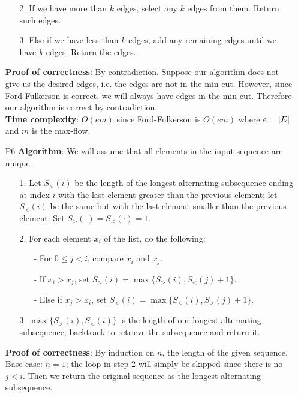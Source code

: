 \documentclass{article}
\begin{document}
\begin{itemize}
\begin{itemize}
              \item [2.] If we have more than $k$ edges, select any $k$ edges from them. Return such edges.
              \item [3.] Else if we have less than $k$ edges, add any remaining edges until we have $k$ edges. Return the edges.
          \end{itemize}
          \textbf{Proof of correctness}: By contradiction. Suppose our algorithm does not give us the desired edges, i.e. the edges are not in the min-cut. However, since Ford-Fulkerson is correct, we will always have edges in the min-cut. Therefore our algorithm is correct by contradiction.\\
          \textbf{Time complexity}: $O(em)$ since Ford-Fulkerson is $O(em)$ where $e=\abs{E}$ and $m$ is the max-flow.
    \item [P6]
          \textbf{Algorithm}: We will assume that all elements in the input sequence are unique.
          \begin{itemize}
              \item [1.] Let $S_>(i)$ be the length of the longest alternating subsequence ending at index $i$ with the last element greater than the previous element; let $S_<(i)$ be the same but with the last element smaller than the previous element. Set $S_>(\cdot)=S_<(\cdot)=1$.
              \item [2.] For each element $x_i$ of the list, do the following:
                    \begin{itemize}
                        \item [-] For $0\leq j<i$, compare $x_i$ and $x_j$.
                        \item [-] If $x_i>x_j$, set $S_>(i)=\max\{S_>(i),S_<(j)+1\}$.
                        \item [-] Else if $x_j>x_i$, set $S_<(i)=\max\{S_<(i),S_>(j)+1\}$.
                    \end{itemize}
              \item [3.] $\max\{S_>(i),S_<(i)\}$ is the length of our longest alternating subsequence, backtrack to retrieve the subsequence and return it.
          \end{itemize}
          \textbf{Proof of correctness}: By induction on $n$, the length of the given sequence.\\
          Base case: $n=1$; the loop in step 2 will simply be skipped since there is no $j<i$. Then we return the original sequence as the longest alternating subsequence.\\

\end{itemize}
\end{document}
